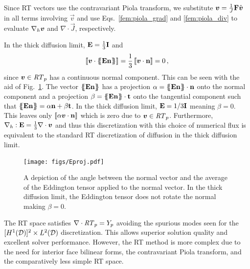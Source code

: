 \documentclass[../doc.tex]{subfiles}
\begin{document}
Since RT vectors use the contravariant Piola transform, we substitute $\boldsymbol{v} = \frac{1}{J}\boldsymbol{\mathrm{F}}\hat{\boldsymbol{v}}$ in all terms involving $\vec{v}$ and use Eqs.~\ref{fem:piola_grad} and \ref{fem:piola_div} to evaluate $\nabla_h\boldsymbol{v}$ and $\nabla\cdot\vec{J}$, respectively. 

In the thick diffusion limit, $\boldsymbol{\mathrm{E}} = \frac{1}{3}\boldsymbol{\mathrm{I}}$ and 
	\begin{equation}
		\left\llbracket\boldsymbol{v}\cdot\left\{\!\!\left\{\boldsymbol{\mathrm{E}}\boldsymbol{\mathrm{n}}\right\}\!\!\right\} \right\rrbracket = \frac{1}{3}\left\llbracket\boldsymbol{v}\cdot\boldsymbol{\mathrm{n}} \right\rrbracket = 0 \,, 
	\end{equation}
since $\boldsymbol{v} \in \mathit{RT}_p$ has a continuous normal component. This can be seen with the aid of Fig.~\ref{rtvef:Eproj}. The vector $\left\{\!\!\left\{\boldsymbol{\mathrm{E}}\boldsymbol{\mathrm{n}}\right\}\!\!\right\}$ has a projection $\alpha = \left\{\!\!\left\{\boldsymbol{\mathrm{E}}\boldsymbol{\mathrm{n}}\right\}\!\!\right\}\cdot\boldsymbol{\mathrm{n}}$ onto the normal component and a projection $\beta = \left\{\!\!\left\{\boldsymbol{\mathrm{E}}\boldsymbol{\mathrm{n}}\right\}\!\!\right\}\cdot\boldsymbol{\mathrm{t}}$ onto the tangential component such that $\left\{\!\!\left\{\boldsymbol{\mathrm{E}}\boldsymbol{\mathrm{n}}\right\}\!\!\right\} = \alpha \boldsymbol{\mathrm{n}} + \beta \boldsymbol{\mathrm{t}}$. In the thick diffusion limit, $\boldsymbol{\mathrm{E}} = 1/3\boldsymbol{\mathrm{I}}$ meaning $\beta = 0$. This leaves only $\left\llbracket\alpha \boldsymbol{v}\cdot\boldsymbol{\mathrm{n}} \right\rrbracket$ which is zero due to $\boldsymbol{v} \in \mathit{RT}_p$. 
Furthermore, $\nabla_h:\boldsymbol{\mathrm{E}} = \frac{1}{3}\nabla\cdot\boldsymbol{v}$ and thus this discretization with this choice of numerical flux is equivalent to the standard RT discretization of diffusion in the thick diffusion limit. 
\begin{figure}
\centering
\texttt{[image: figs/Eproj.pdf]}
\caption{A depiction of the angle between the normal vector and the average of the Eddington tensor applied to the normal vector. In the thick diffusion limit, the Eddington tensor does not rotate the normal making $\beta =0$. }
\label{rtvef:Eproj}
\end{figure}

The RT space satisfies $\nabla\cdot\mathit{RT}_p = Y_p$ avoiding the spurious modes seen for the $[H^1(\mathcal{D})]^2 \times L^2(\mathcal{D})$ discretization. This allows superior solution quality and excellent solver performance. However, the RT method is more complex due to the need for interior face bilinear forms, the contravariant Piola transform, and the comparatively less simple RT space. 
\end{document}
